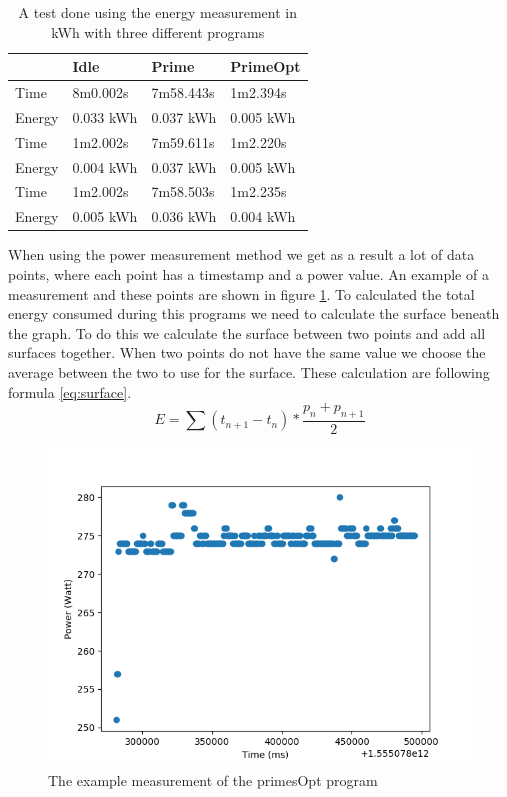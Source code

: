 \begin{table}[h]
\centering
\begin{tabular}{|l|l|l|l|}
\hline
       & Idle      & Prime     & PrimeOpt  \\ \hline
Time   & 8m0.002s  & 7m58.443s & 1m2.394s  \\
Energy & 0.033 kWh & 0.037 kWh & 0.005 kWh \\ \hline
Time   & 1m2.002s  & 7m59.611s & 1m2.220s  \\
Energy & 0.004 kWh & 0.037 kWh & 0.005 kWh \\ \hline
Time   & 1m2.002s  & 7m58.503s & 1m2.235s  \\
Energy & 0.005 kWh & 0.036 kWh & 0.004 kWh \\ \hline
\end{tabular}
\caption{A test done using the energy measurement in kWh with three different programs}
\label{tab:EMmethod}
\end{table}

When using the power measurement method we get as a result a lot of data points, where each point has a timestamp and a power value. An example of a measurement and these points are shown in figure \ref{fig:primesOpt}. To calculated the total energy consumed during this programs we need to calculate the surface beneath the graph. To do this we calculate the surface between two points and add all surfaces together. When two points do not have the same value we choose the average between the two to use for the surface. These calculation are following formula \ref{eq:surface}.\\

\begin{equation} \label{eq:surface}
    E = \sum (t_{n+1} - t_{n}) * \frac{p_{n} + p_{n+1}}{2}
\end{equation}

\begin{figure}[h]
    \centering
    \includegraphics[width=.4\textwidth]{graphs/primesOpt.png}
    \caption{The example measurement of the primesOpt program}
    \label{fig:primesOpt}
\end{figure}

